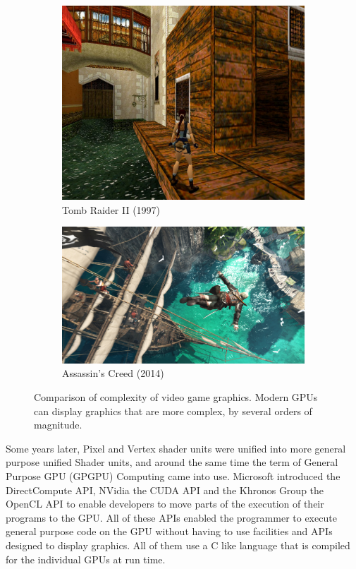 \begin{figure}
  \centering
  \begin{subfigure}{.4\textwidth}
      \centering
      \includegraphics[width=.95\linewidth]{images/oldGraphics}
      \caption{Tomb Raider II (1997)}
      \label{fig:intro_tomb}
  \end{subfigure}
  \begin{subfigure}{.55\textwidth}
      \centering
      \includegraphics[width=.95\linewidth]{images/modernGraphics}
      \caption{Assassin's Creed (2014)}
      \label{fig:intro_assassin}
  \end{subfigure}
  \caption{Comparison of complexity of video game graphics. Modern GPUs can display graphics that are more complex, by several orders of magnitude.}
  \label{fig:intro_videogamecomp}
\end{figure}

Some years later, Pixel and Vertex shader units were unified into more general purpose unified Shader units, and around the same time the term of General Purpose GPU (GPGPU) Computing came into use. Microsoft introduced the DirectCompute API, NVidia the CUDA API and the Khronos Group the OpenCL API to enable developers to move parts of the execution of their programs to the GPU. All of these APIs enabled the programmer to execute general purpose code on the GPU without having to use facilities and APIs designed to display graphics. All of them use a C like language that is compiled for the individual GPUs at run time. \cite{khronos2008release,khronos2012specification,nvidia2009opencl} \\
\newpage



